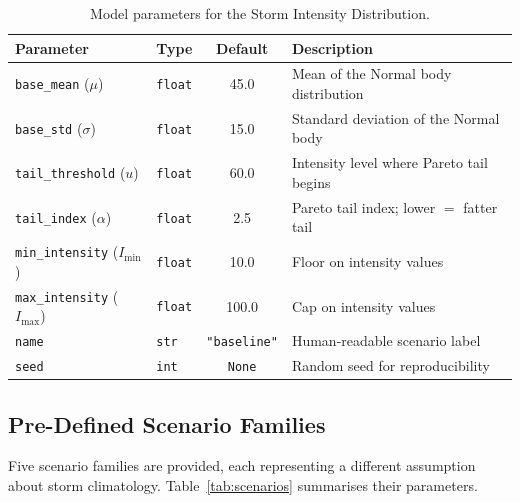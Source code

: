 \documentclass[11pt,a4paper]{article}
\begin{document}
\begin{table}[H]
    \centering
    \caption{Model parameters for the Storm Intensity Distribution.}
    \label{tab:parameters}
    \begin{tabular}{llcl}
        \toprule
        \textbf{Parameter} & \textbf{Type} & \textbf{Default} & \textbf{Description} \\
        \midrule
        \texttt{base\_mean} ($\mu$)
            & \texttt{float} & 45.0
            & Mean of the Normal body distribution \\
        \texttt{base\_std} ($\sigma$)
            & \texttt{float} & 15.0
            & Standard deviation of the Normal body \\
        \texttt{tail\_threshold} ($u$)
            & \texttt{float} & 60.0
            & Intensity level where Pareto tail begins \\
        \texttt{tail\_index} ($\alpha$)
            & \texttt{float} & 2.5
            & Pareto tail index; lower $=$ fatter tail \\
        \texttt{min\_intensity} ($I_{\min}$)
            & \texttt{float} & 10.0
            & Floor on intensity values \\
        \texttt{max\_intensity} ($I_{\max}$)
            & \texttt{float} & 100.0
            & Cap on intensity values \\
        \texttt{name}
            & \texttt{str} & \texttt{"baseline"}
            & Human-readable scenario label \\
        \texttt{seed}
            & \texttt{int} & \texttt{None}
            & Random seed for reproducibility \\
        \bottomrule
    \end{tabular}
\end{table}

\subsection{Pre-Defined Scenario Families}
\label{sec:scenarios}

Five scenario families are provided, each representing a different assumption about
storm climatology. Table~\ref{tab:scenarios} summarises their parameters.
\end{document}
